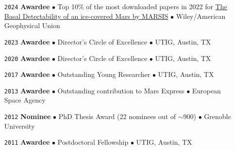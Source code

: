 \begin{itemize}[leftmargin=3.8em, labelsep=1.5em]
    \item[\texttt{2024}] \textbf{Awardee} $\bullet$ Top 10\% of the most downloaded papers in 2022 for \href{https://doi.org/10.1029/2021GL096518}{The Basal Detectability of an ice-covered Mars by MARSIS} $\bullet$ Wiley/American Geophysical Union
    \item[\texttt{2023}] \textbf{Awardee} $\bullet$ Director's Circle of Excellence $\bullet$ UTIG, Austin, TX
    \item[\texttt{2020}] \textbf{Awardee} $\bullet$ Director's Circle of Excellence $\bullet$ UTIG, Austin, TX
    \item[\texttt{2017}] \textbf{Awardee} $\bullet$ Outstanding Young Researcher $\bullet$ UTIG, Austin, TX
    \item[\texttt{2013}] \textbf{Awardee} $\bullet$ Outstanding contribution to Mars Express $\bullet$ European Space Agency
    \item[\texttt{2012}] \textbf{Nominee} $\bullet$ PhD Thesis Award (22 nominees out of $\sim$900) $\bullet$ Grenoble University
    \item[\texttt{2011}] \textbf{Awardee} $\bullet$ Postdoctoral Fellowship $\bullet$ UTIG, Austin, TX
    
\end{itemize}

